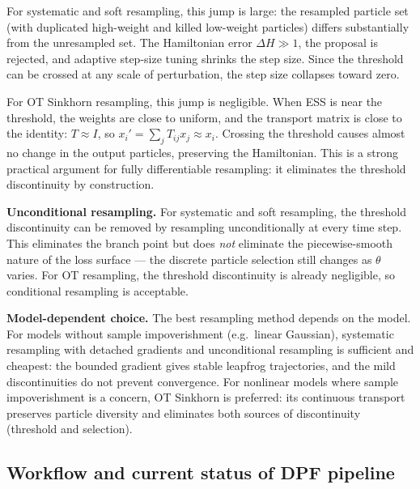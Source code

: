 \documentclass{article}
\begin{document}
For systematic and soft resampling, this jump is large: the resampled particle set (with duplicated high-weight and killed low-weight particles) differs substantially from the unresampled set. The Hamiltonian error $\Delta H \gg 1$, the proposal is rejected, and adaptive step-size tuning shrinks the step size. Since the threshold can be crossed at any scale of perturbation, the step size collapses toward zero.

For OT Sinkhorn resampling, this jump is negligible. When ESS is near the threshold, the weights are close to uniform, and the transport matrix is close to the identity: $T \approx I$, so $x_i' = \sum_j T_{ij} x_j \approx x_i$. Crossing the threshold causes almost no change in the output particles, preserving the Hamiltonian. This is a strong practical argument for fully differentiable resampling: it eliminates the threshold discontinuity by construction.

\textbf{Unconditional resampling.} For systematic and soft resampling, the threshold discontinuity can be removed by resampling unconditionally at every time step. This eliminates the branch point but does \textit{not} eliminate the piecewise-smooth nature of the loss surface --- the discrete particle selection still changes as $\theta$ varies. For OT resampling, the threshold discontinuity is already negligible, so conditional resampling is acceptable.

\textbf{Model-dependent choice.} The best resampling method depends on the model. For models without sample impoverishment (e.g.\ linear Gaussian), systematic resampling with detached gradients and unconditional resampling is sufficient and cheapest: the bounded gradient gives stable leapfrog trajectories, and the mild discontinuities do not prevent convergence. For nonlinear models where sample impoverishment is a concern, OT Sinkhorn is preferred: its continuous transport preserves particle diversity and eliminates both sources of discontinuity (threshold and selection).




\subsection{Workflow and current status of DPF pipeline}
\end{document}

